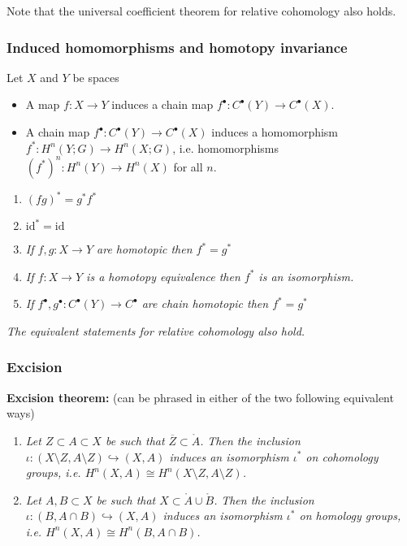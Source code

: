 \documentclass[10pt]{article}
\newcommand{\id}{\mathrm{id}}
\newcommand{\interior}[1]{\mathring{#1}}
\newcommand{\closure}[1]{\overline{#1}}
\begin{document}
                Note that the universal coefficient theorem for relative cohomology also holds.

            \subsubsection{Induced homomorphisms and homotopy invariance}

                Let $X$ and $Y$ be spaces

                \begin{itemize}
                    \item A map $f\colon X\to Y$ induces a chain map $f^\bullet\colon C^\bullet(Y)\to C^\bullet(X)$.
                    \item A chain map $f^\bullet\colon C^\bullet(Y)\to C^\bullet(X)$ induces a homomorphism $f^*\colon H^n(Y;G)\to H^n(X;G)$, i.e. homomorphisms $(f^*)^n\colon H^n(Y)\to H^n(X)$ for all $n$.
                \end{itemize}

                \begin{enumerate}
                    \item $(fg)^*=g^*f^*$
                    \item $\id^*=\id$
                    \item \emph{If $f,g\colon X\to Y$ are homotopic then $f^*=g^*$}
                    \item \emph{If $f\colon X\to Y$ is a homotopy equivalence then $f^*$ is an isomorphism.}
                    \item \emph{If $f^\bullet,g^\bullet\colon C^\bullet(Y)\to C^\bullet$ are chain homotopic then $f^*=g^*$}
                \end{enumerate}

                \emph{The equivalent statements for relative cohomology also hold.}

            \subsubsection{Excision}

                \textbf{Excision theorem:} (can be phrased in either of the two following equivalent ways)
                \begin{enumerate}
                    \item \emph{Let $Z\subset A\subset X$ be such that $\closure{Z}\subset\interior{A}$.}
                        \emph{Then the inclusion $\iota\colon(X\setminus Z,A\setminus Z)\hookrightarrow(X,A)$ induces an isomorphism $\iota^*$ on cohomology groups, i.e. $H^n(X,A)\cong H^n(X\setminus Z,A\setminus Z)$.}
                    \item \emph{Let $A,B\subset X$ be such that $X\subset\interior{A}\cup\interior{B}$.}
                        \emph{Then the inclusion $\iota\colon(B,A\cap B)\hookrightarrow(X,A)$ induces an isomorphism $\iota^*$ on homology groups, i.e. $H^n(X,A)\cong H^n(B,A\cap B)$.}
                \end{enumerate}
\end{document}
